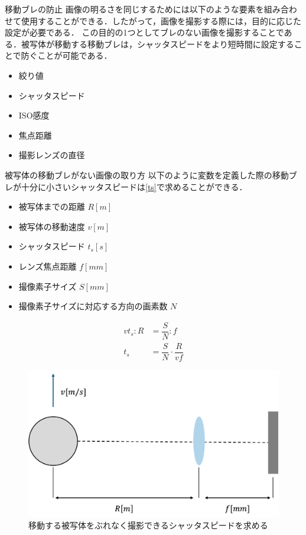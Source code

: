 \documentclass[8pt, jfont=ipaexm, t]{beamer} %
\begin{document}
\begin{frame}[allowframebreaks]{移動ブレの防止}
  画像の明るさを同じするためには以下のような要素を組み合わせて使用することができる．したがって，画像を撮影する際には，目的に応じた設定が必要である．
  この目的の1つとしてブレのない画像を撮影することである．被写体が移動する移動ブレは，シャッタスピードをより短時間に設定することで防ぐことが可能である．
  \begin{itemize}
    \item 絞り値
    \item シャッタスピード
    \item ISO感度
    \item 焦点距離
    \item 撮影レンズの直径
  \end{itemize}

  \newpage
  \begin{exampleblock}{被写体の移動ブレがない画像の取り方}
    \tiny
    以下のように変数を定義した際の移動ブレが十分に小さいシャッタスピードは\eqref{ts}で求めることができる．
    \begin{itemize}
      \item 被写体までの距離 $R[m]$
      \item 被写体の移動速度 $v[m]$
      \item シャッタスピード $t_s[s]$
      \item レンズ焦点距離 $f[mm]$
      \item 撮像素子サイズ $S[mm]$
      \item 撮像素子サイズに対応する方向の画素数 $N$
    \end{itemize}
    \begin{equation}\label{ts}
      \begin{split}
        vt_s : R &= \dfrac{S}{N} : f \\
        t_s &= \dfrac{S}{N} \cdot \dfrac{R}{vf}
      \end{split}
    \end{equation}
  \end{exampleblock}

  \begin{figure}[H]
    \centering
    \includegraphics[scale=0.21]{figure/05.png}
    \caption{移動する被写体をぶれなく撮影できるシャッタスピードを求める}
    \label{fig:05}
  \end{figure}


\end{frame}
\end{document}
